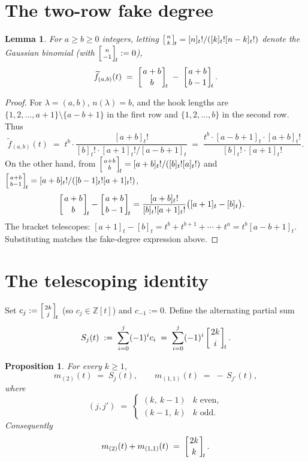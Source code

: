 \documentclass[11pt]{article}
\newtheorem{proposition}[theorem]{Proposition}
\newtheorem{lemma}[theorem]{Lemma}
\theoremstyle{definition}
\theoremstyle{remark}
\newcommand{\fdeg}{\widetilde{f}}
\newcommand{\qbinom}[2]{\left[{#1 \atop #2}\right]_{\!t}}
\begin{document}
\section{The two-row fake degree}

\begin{lemma}\label{lem:two-row}
For $a \ge b \ge 0$ integers, letting $\qbinom{n}{k} = [n]_t!/([k]_t! [n-k]_t!)$
denote the Gaussian binomial (with $\qbinom{n}{-1} := 0$),
\[
\fdeg_{(a,b)}(t) \;=\; \qbinom{a+b}{b} \;-\; \qbinom{a+b}{b-1}.
\]
\end{lemma}

\begin{proof}
For $\lambda = (a, b)$, $n(\lambda) = b$, and the hook lengths are
$\{1, 2, \ldots, a+1\} \setminus \{a - b + 1\}$ in the first row and
$\{1, 2, \ldots, b\}$ in the second row. Thus
\[
\fdeg_{(a,b)}(t) \;=\; t^b \cdot \frac{[a+b]_t!}{[b]_t! \cdot [a+1]_t! / [a-b+1]_t}
\;=\; \frac{t^b \cdot [a-b+1]_t \cdot [a+b]_t!}{[b]_t! \cdot [a+1]_t!}.
\]
On the other hand, from $\qbinom{a+b}{b} = [a+b]_t!/([b]_t! [a]_t!)$ and
$\qbinom{a+b}{b-1} = [a+b]_t!/([b-1]_t! [a+1]_t!)$,
\begin{align*}
\qbinom{a+b}{b} - \qbinom{a+b}{b-1}
&= \frac{[a+b]_t!}{[b]_t![a+1]_t!}\bigl([a+1]_t - [b]_t\bigr).
\end{align*}
The bracket telescopes: $[a+1]_t - [b]_t = t^b + t^{b+1} + \cdots + t^a = t^b [a-b+1]_t$.
Substituting matches the fake-degree expression above.
\end{proof}

\section{The telescoping identity}

Set $c_j := \qbinom{2k}{j}$ (so $c_j \in \mathbb{Z}[t]$) and $c_{-1} := 0$. Define the alternating partial sum
\[
S_j(t) \;:=\; \sum_{i=0}^{j} (-1)^i c_i \;=\; \sum_{i=0}^{j} (-1)^i \qbinom{2k}{i}.
\]

\begin{proposition}\label{prop:telescope}
For every $k \ge 1$,
\[
m_{(2)}(t) \;=\; S_{j}(t), \qquad m_{(1,1)}(t) \;=\; -\,S_{j'}(t),
\]
where
\[
(j, j') \;=\; \begin{cases}(k,\ k-1) & \text{$k$ even},\\
(k-1,\ k) & \text{$k$ odd}.\end{cases}
\]
Consequently
\[
m_{(2)}(t) + m_{(1,1)}(t) \;=\; \qbinom{2k}{k}.
\]
\end{proposition}
\end{document}
